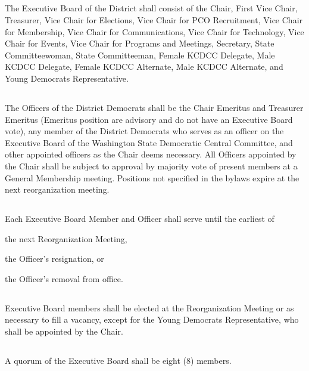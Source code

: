 \documentclass{article}
\newcommand{\fortythird}{\nth{43}}
\newcommand{\district}{\fortythird{} District}
\newcommand{\thedistrict}{the \district{}}
\begin{document}
\subsection{}
The Executive Board of \thedistrict{} shall consist of the Chair, First Vice Chair, Treasurer, Vice Chair for Elections, Vice Chair for PCO Recruitment, Vice Chair for Membership, Vice Chair for Communications, Vice Chair for Technology, Vice Chair for Events, Vice Chair for Programs and Meetings, Secretary, State Committeewoman, State Committeeman, Female KCDCC Delegate, Male KCDCC Delegate, Female KCDCC Alternate, Male KCDCC Alternate, and Young Democrats Representative.

\subsection{}
The Officers of \thedistrict{} Democrats shall be the Chair Emeritus and Treasurer Emeritus (Emeritus position are advisory and do not have an Executive Board vote), any member of \thedistrict{} Democrats who serves as an officer on the Executive Board of the Washington State Democratic Central Committee, and other appointed officers as the Chair deems necessary. All Officers appointed by the Chair shall be subject to approval by majority vote of present members at a General Membership meeting. Positions not specified in the bylaws expire at the next reorganization meeting.

\subsection{}
Each Executive Board Member and Officer shall serve until the earliest of
\begin{inlinealphalist}
    \item the next Reorganization Meeting,
    \item the Officer’s resignation, or
    \item the Officer’s removal from office.
\end{inlinealphalist}

\subsection{}
Executive Board members shall be elected at the Reorganization Meeting or as necessary to fill a vacancy, except for the Young Democrats Representative, who shall be appointed by the Chair.

\subsection{}
A quorum of the Executive Board shall be eight (8) members.
\end{document}
